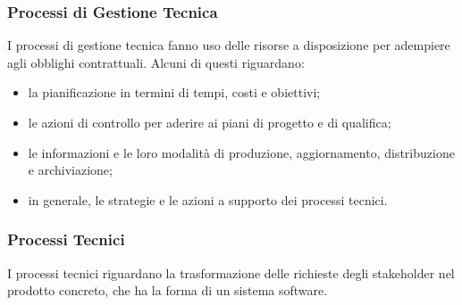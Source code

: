 		\subsubsection{Processi di Gestione Tecnica}
		I processi di gestione tecnica fanno uso delle risorse a disposizione per adempiere agli obblighi contrattuali. Alcuni di questi riguardano:
		\begin{itemize}
			\item la pianificazione in termini di tempi, costi e obiettivi;
			\item le azioni di controllo per aderire ai piani di progetto e di qualifica;
			\item le informazioni e le loro modalità di produzione, aggiornamento, distribuzione e archiviazione;
			\item in generale, le strategie e le azioni a supporto dei processi tecnici.
		\end{itemize}
		
		\subsubsection{Processi Tecnici}
		I processi tecnici riguardano la trasformazione delle richieste degli stakeholder nel prodotto concreto, che ha la forma di un sistema software.
		
		
			
	
	\pagebreak
